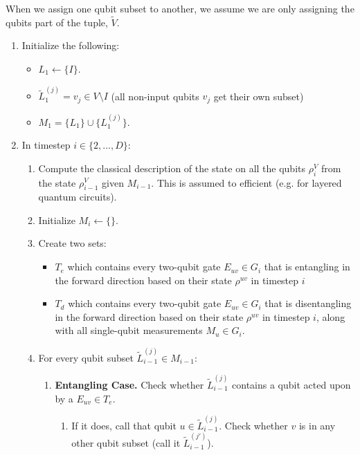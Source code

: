 When we assign one qubit subset to another, we assume we are only assigning the qubits part of the tuple, $\tilde{V}$.

\begin{enumerate}
\item
Initialize the following:
\begin{itemize}
\item
$L_1 \leftarrow \{ I \}$.
\item
$\tilde{L}^{(j)}_1 = v_j \in V \setminus I$ (all non-input qubits $v_j$ get their own subset)
\item
$M_1 = \{ L_1 \} \cup \{ L^{(j)}_1 \}$.
\end{itemize}

\item
In timestep $i \in \{2, \ldots, D \}$:

\begin{enumerate}

\item
Compute the classical description of the state on all the qubits $\rho^{V}_i$ from the state $\rho^{V}_{i-1}$
given $M_{i-1}$.
This is assumed to efficient (e.g. for layered quantum circuits). 
\item
Initialize $M_i \leftarrow \{\}$.
\item
Create two sets:
\begin{itemize}
\item $T_e$ which contains every two-qubit
gate $E_{uv} \in G_i$ that is entangling in the forward direction based on
their state $\rho^{uv}$ in timestep $i$
\item $T_d$ which contains every two-qubit
gate $E_{uv} \in G_i$ that is disentangling in the forward direction
 based on
their state $\rho^{uv}$ in timestep $i$,
along with all single-qubit measurements $M_u \in G_i$.
\end{itemize}

\item
For every qubit subset $\tilde{L}^{(j)}_{i-1} \in M_{i-1}$:

\begin{enumerate}
\item \textbf{Entangling Case.} Check whether $\tilde{L}^{(j)}_{i-1}$ contains a qubit acted upon by a
$E_{uv} \in T_e$.

\begin{enumerate}
\item If it does, call that qubit
$u \in \tilde{L}^{(j)}_{i-1}$.
Check whether $v$ is in any other qubit subset
(call it $\tilde{L}^{(j')}_{i-1}$).


\end{enumerate}
\end{enumerate}
\end{enumerate}
\end{enumerate}
